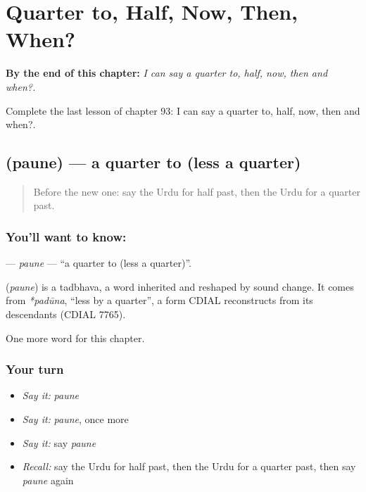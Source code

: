 
\chapter{Quarter to, Half, Now, Then, When?}
\label{ch:ur-quarter-to-half-now-then-when}

\begin{chapteropening}
\textbf{By the end of this chapter:} \emph{I can say a quarter to, half, now, then and when?.}

Complete the last lesson of chapter 93: I can say a quarter to, half, now, then and when?.
\end{chapteropening}

\section[\texorpdfstring{\ur{پونے} (paune)}{پونے (paune)}]{ (paune) — a quarter to (less a quarter)}

\label{lesson:UR-C93-paune}



\begin{quote}
Before the new one: say the Urdu for half past, then the Urdu for a quarter past.
\end{quote}

\subsection*{You'll want to know: }
\textbf{} — \emph{paune} — \textquotedblleft{}a quarter to (less a quarter)\textquotedblright{}.

\begin{cousinweb}
\textbf{} (\emph{paune}) is a tadbhava, a word inherited and reshaped by sound change. It comes from \emph{*padūna}, \textquotedblleft{}less by a quarter\textquotedblright{}, a form CDIAL reconstructs from its descendants (CDIAL 7765).
\end{cousinweb}

\begin{grammarlens}[title={What you've built}]
One more word for this chapter.
\end{grammarlens}

\subsection*{Your turn}
\begin{itemize}
\raggedright
  \item \emph{Say it:} \emph{paune}
  \item \emph{Say it:} \emph{paune}, once more
  \item \emph{Say it:} say \emph{paune}
  \item \emph{Recall:} say the Urdu for half past, then the Urdu for a quarter past, then say \emph{paune} again
\end{itemize}

